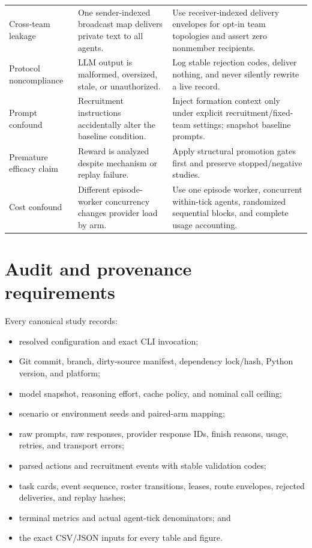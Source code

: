 \documentclass[11pt]{article}
\begin{document}
\begin{longtable}{@{}p{}p{}p{}@{}}
\addlinespace
Cross-team leakage &
One sender-indexed broadcast map delivers private text to all agents. &
Use receiver-indexed delivery envelopes for opt-in team topologies and assert
zero nonmember recipients.\\
\addlinespace
Protocol noncompliance &
LLM output is malformed, oversized, stale, or unauthorized. &
Log stable rejection codes, deliver nothing, and never silently rewrite a live
record.\\
\addlinespace
Prompt confound &
Recruitment instructions accidentally alter the baseline condition. &
Inject formation context only under explicit recruitment/fixed-team settings;
snapshot baseline prompts.\\
\addlinespace
Premature efficacy claim &
Reward is analyzed despite mechanism or replay failure. &
Apply structural promotion gates first and preserve stopped/negative studies.\\
\addlinespace
Cost confound &
Different episode-worker concurrency changes provider load by arm. &
Use one episode worker, concurrent within-tick agents, randomized sequential
blocks, and complete usage accounting.\\
\bottomrule
\end{longtable}

\section{Audit and provenance requirements}

Every canonical study records:

\begin{itemize}
  \item resolved configuration and exact CLI invocation;
  \item Git commit, branch, dirty-source manifest, dependency lock/hash, Python
  version, and platform;
  \item model snapshot, reasoning effort, cache policy, and nominal call ceiling;
  \item scenario or environment seeds and paired-arm mapping;
  \item raw prompts, raw responses, provider response IDs, finish reasons,
  usage, retries, and transport errors;
  \item parsed actions and recruitment events with stable validation codes;
  \item task cards, event sequence, roster transitions, leases, route envelopes,
  rejected deliveries, and replay hashes;
  \item terminal metrics and actual agent-tick denominators; and
  \item the exact CSV/JSON inputs for every table and figure.
\end{itemize}
\end{document}
